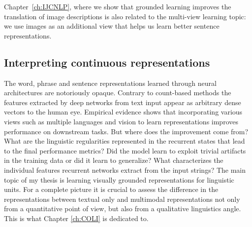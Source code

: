 Chapter~\ref{ch:IJCNLP}, where we show that grounded learning improves the translation
of image descriptions is also related to the multi-view learning topic: we use
images as an additional view that helps us learn better sentence representations.





\subsection{Interpreting continuous representations}
\label{sec:interpret}
The word, phrase and sentence representations learned through neural architectures are notoriously opaque.
Contrary to count-based methods the features extracted by deep networks from text input
appear as arbitrary dense vectors to the human eye.
Empirical evidence shows that incorporating various views such as multiple languages and vision to
learn representations improves performance on downstream tasks.
But where does the improvement come from? What are the linguistic
regularities represented in the recurrent states that lead to the final performance metrics?
Did the model learn to exploit trivial artifacts in the training data or did it learn to generalize?
What characterizes the individual features recurrent networks extract from the input strings?
The main topic of my thesis is learning visually grounded representations for linguistic units.
For a complete picture it is crucial to assess the difference in the representations
between textual only and multimodal representations not only from a quantitative point of view,
but also from a qualitative linguistics angle.
This is what Chapter \ref{ch:COLI} is dedicated to.

